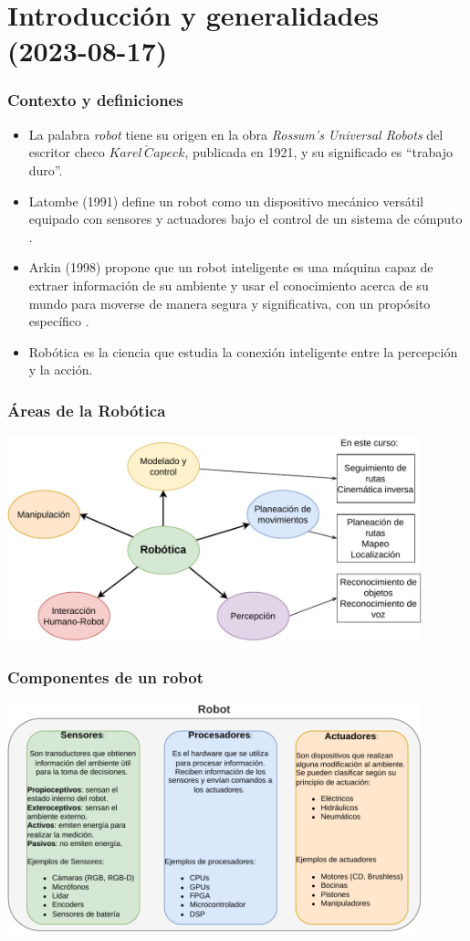 \section{Introducción y generalidades (2023-08-17)}
\begin{frame}\frametitle{Contexto y definiciones}
  \begin{itemize}
  \item La palabra \textit{robot} tiene su origen en la obra \textit{Rossum's Universal Robots} del escritor checo $Karel \,\check{C}apeck$, publicada en 1921, y su significado es ``trabajo duro''.
  \item Latombe (1991) define un robot como un dispositivo mecánico versátil equipado con sensores y actuadores bajo el control de un sistema de cómputo \cite{Latombe1991MotionPlanning}.
  \item Arkin (1998) propone que un robot inteligente es una máquina capaz de extraer información de su ambiente y usar el conocimiento acerca de su mundo para moverse de manera segura y significativa, con un propósito específico \cite{Arkin1998BehBasedRobo}.
  \item Robótica es la ciencia que estudia la conexión inteligente entre la percepción y la acción. 
  \end{itemize}
\end{frame}

\begin{frame}\frametitle{Áreas de la Robótica}
  
  \includegraphics[width=0.9\textwidth]{Figures/RoboticsAreas.pdf}
\end{frame}

\begin{frame}\frametitle{Componentes de un robot}
  \includegraphics[width=0.9\textwidth]{Figures/RobotComponents.pdf}
\end{frame}

